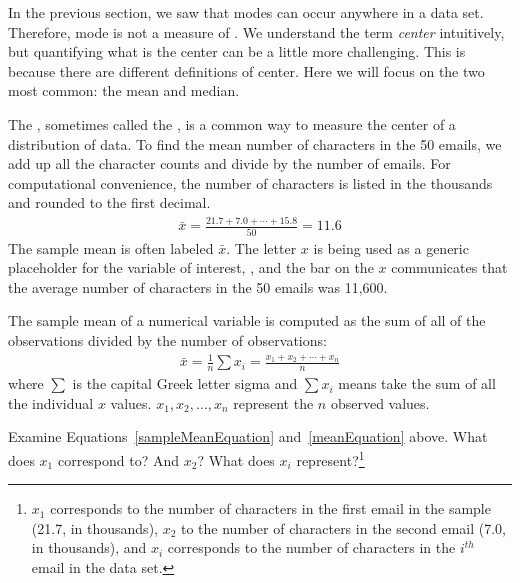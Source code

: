 In the previous section, we saw that modes can occur anywhere in a data set. Therefore, mode is not a measure of . We understand the term \emph{center} intuitively, but quantifying what is the center can be a little more challenging. This is because there are different definitions of center. Here we will focus on the two most common: the mean and median.

The , sometimes called the , is a common way to measure the center of a distribution of data. To find the mean number of characters in the 50 emails, we add up all the character counts and divide by the number of emails. For computational convenience, the number of characters is listed in the thousands and rounded to the first decimal.
\begin{eqnarray}
\bar{x} = \frac{21.7 + 7.0 + \cdots + 15.8}{50} = 11.6
\label{sampleMeanEquation}
\end{eqnarray}
The sample mean is often labeled $\bar{x}$. The letter $x$ is being used as a generic placeholder for the variable of interest, , and the bar on the $x$ communicates that the average number of characters in the 50 emails was 11,600.

\begin{termBox}{
The sample mean of a numerical variable is computed as the sum of all of the observations divided by the number of observations:
\begin{eqnarray}
\bar{x} = \frac{1}{n}\sum{x_{i}} = \frac{x_1+x_2+\cdots+x_n}{n}
\label{meanEquation}
\end{eqnarray}
where $\sum$ is the capital Greek letter sigma and $\sum{x_{i}}$ means take the sum of all the individual $x$ values.
 $x_1, x_2, \dots, x_n$ represent the $n$ observed values.}
\end{termBox}

\begin{exercise}
Examine Equations~\eqref{sampleMeanEquation} and~\eqref{meanEquation} above. What does $x_1$ correspond to? And $x_2$? What does $x_i$ represent?\footnote{$x_1$ corresponds to the number of characters in the first email in the sample (21.7, in thousands), $x_2$ to the number of characters in the second email (7.0, in thousands), and $x_i$ corresponds to the number of characters in the $i^{th}$ email in the data set.}
\end{exercise}

